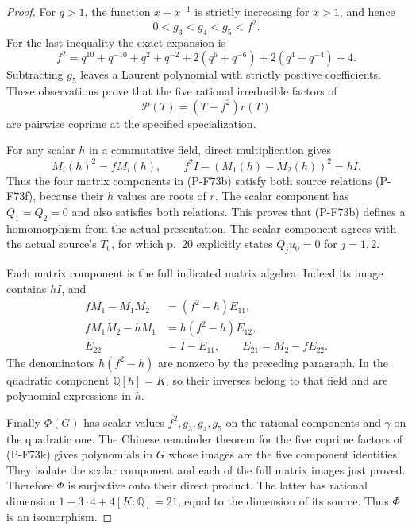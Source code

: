 \begin{proof}
For $q>1$, the function $x+x^{-1}$ is strictly
increasing for $x>1$, and hence
\[
                        0<g_3<g_4<g_5<f^2.
                                                               \tag{P-F73i}
\]
For the last inequality the exact expansion is
\[
 f^2=q^{10}+q^{-10}+q^2+q^{-2}
             +2(q^6+q^{-6})+2(q^4+q^{-4})+4.
                                                               \tag{P-F73j}
\]
Subtracting $g_5$ leaves a Laurent polynomial with
strictly positive coefficients.  These observations
prove that the five rational irreducible factors of
\[
                      \mathcal P(T)=(T-f^2)r(T)
                                                               \tag{P-F73k}
\]
are pairwise coprime at the specified specialization.

For any scalar $h$ in a commutative field, direct
multiplication gives
\[
 M_i(h)^2=fM_i(h),\qquad
             f^2I-(M_1(h)-M_2(h))^2=hI.
                                                               \tag{P-F73l}
\]
Thus the four matrix components in (P-F73b) satisfy
both source relations (P-F73f), because their $h$
values are roots of $r$.  The scalar component has
$Q_1=Q_2=0$ and also satisfies both relations.  This
proves that (P-F73b) defines a homomorphism from the
actual presentation.  The scalar component agrees
with the actual source's $T_0$, for which p.~20
explicitly states $Q_j u_0=0$ for $j=1,2$.

Each matrix component is the full indicated matrix
algebra.  Indeed its image contains $hI$, and
\[
 \begin{split}
 fM_1-M_1M_2&=(f^2-h)E_{11},\\
 fM_1M_2-hM_1&=h(f^2-h)E_{12},\\
 E_{22}&=I-E_{11},\qquad E_{21}=M_2-fE_{22}.
 \end{split}                                                   \tag{P-F73m}
\]
The denominators $h(f^2-h)$ are nonzero by the
preceding paragraph.  In the quadratic component
$\mathbb Q[h]=K$, so their inverses belong to that
field and are polynomial expressions in $h$.

Finally $\Phi(G)$ has scalar values $f^2,g_3,g_4,g_5$
on the rational components and $\gamma$ on the
quadratic one.  The Chinese remainder theorem for
the five coprime factors of (P-F73k) gives polynomials
in $G$ whose images are the five component identities.
They isolate the scalar component and each of the
full matrix images just proved.  Therefore $\Phi$
is surjective onto their direct product.  The latter
has rational dimension
$1+3\cdot4+4[K:\mathbb Q]=21$, equal to the dimension
of its source.  Thus $\Phi$ is an isomorphism.


\end{proof}

